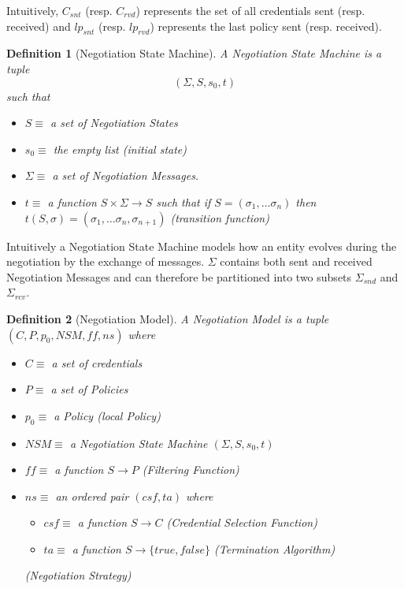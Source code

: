 \documentclass{article}
\newtheorem{definition}{Definition} %
\begin{document}
Intuitively, $C_{snt}$ (resp. $C_{rvd}$) represents the set of all credentials sent (resp. received) and $lp_{snt}$ (resp. $lp_{rvd}$) represents the last policy sent (resp. received).

\begin{definition}[Negotiation State Machine]
A Negotiation State Machine is a tuple $$(\Sigma, S, s_{0}, t)$$ such that
	\begin{itemize}
	\item $S \equiv$ a set of Negotiation States
	\item $s_{0} \equiv $ the empty list (\textit{initial state})
	\item $\Sigma \equiv $ a set of Negotiation Messages.
	\item $t \equiv $ a function $S \times \Sigma \rightarrow S$ such that if $S = (\sigma_{1}, \ldots \sigma_{n})$ then $t(S, \sigma) = (\sigma_{1},  \ldots \sigma_{n}, \sigma_{n+1})$ (\textit{transition function})
	\end{itemize}
\end{definition}

Intuitively a Negotiation State Machine models how an entity evolves during the negotiation by the exchange of messages. $\Sigma$ contains both sent and received Negotiation Messages and can therefore be partitioned into two subsets $\Sigma_{snd}$ and $\Sigma_{rcv}$.

\begin{definition}[Negotiation Model]
A Negotiation Model is a tuple $(C, P, p_{0}, NSM, ff, ns)$ where
	\begin{itemize}
	\item $C \equiv$ a set of credentials
	\item $P \equiv$ a set of Policies
	\item $p_{0} \equiv$ a Policy (\textit{local Policy})
	\item $NSM \equiv$ a Negotiation State Machine $(\Sigma, S, s_{0}, t)$
	\item $ff \equiv$ a function $S \rightarrow P$ (\textit{Filtering Function})
	\item $ns \equiv$ an ordered pair $(csf, ta)$ where
		\begin{itemize}
		\item $csf \equiv$ a function $S \rightarrow C$ (\textit{Credential Selection Function})
		\item $ta \equiv$ a function $S \rightarrow \{true, false\}$ (\textit{Termination Algorithm})
		\end{itemize}
	(\textit{Negotiation Strategy})
	\end{itemize}
\end{definition}
\end{document}
